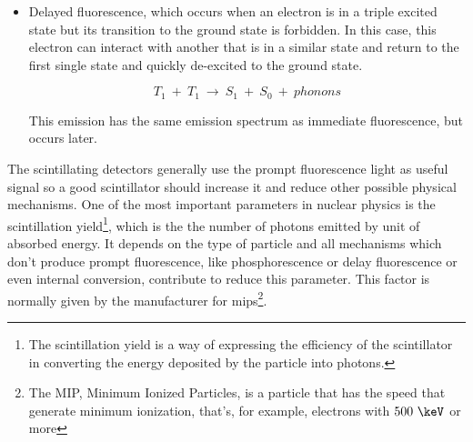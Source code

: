 \begin{itemize}
\item{} Delayed fluorescence, which occurs when an electron is in a triple excited state but its transition to the ground state is forbidden. In this case, this electron can interact with another that is in a similar state and return to the first single state and quickly de-excited to the ground state. 

\begin{equation}
T_{1} ~+~ T_{1}~ \longrightarrow ~ S_{1} ~+~ S_{0} ~+~ phonons
\label{eq:DelayFluorescence}
\end{equation}

This emission has the same emission spectrum as immediate fluorescence, but occurs later.
\end{itemize}

The scintillating detectors generally use the prompt fluorescence light as useful signal so a good scintillator should increase it and reduce other possible physical mechanisms. One of the most important parameters in nuclear physics is the scintillation yield\footnote{The scintillation yield is a way of expressing the efficiency of the scintillator in converting the energy deposited by the particle into photons.}, which is the the number of photons emitted by unit of absorbed energy. It depends on the type of particle and all mechanisms which don't produce prompt fluorescence, like phosphorescence or delay fluorescence or even internal conversion, contribute to reduce this parameter. This factor is normally given by the manufacturer for mips\footnote{The MIP, Minimum Ionized Particles, is a particle that has the speed that generate minimum ionization, that's, for example, electrons with $500~\keV$ or more}.
